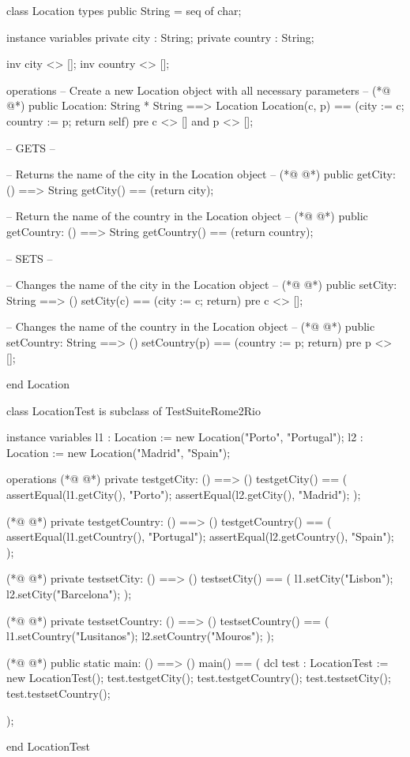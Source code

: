 \begin{vdmpp}[breaklines=true]
class Location
 types
   public String = seq of char;

 instance variables
   private city : String;
   private country : String;
   
   inv city <> [];
   inv country <> [];

 operations
   -- Create a new Location object with all necessary parameters --
(*@
\label{Location:14}
@*)
   public Location: String * String ==> Location
    Location(c, p) == (city := c; country := p; return self)
   pre c <> [] and p <> []; 
  
   -- GETS --
  
   -- Returns the name of the city in the Location object --
(*@
\label{getCity:21}
@*)
   public getCity: () ==> String
    getCity() == (return city);
    
   -- Return the name of the country in the Location object --
(*@
\label{getCountry:25}
@*)
   public getCountry: () ==> String
    getCountry() == (return country);

   -- SETS --
   
   -- Changes the name of the city in the Location object --
(*@
\label{setCity:31}
@*)
   public setCity: String ==> ()
    setCity(c) == (city := c; return)
    pre c <> [];
   
   -- Changes the name of the country in the Location object --
(*@
\label{setCountry:36}
@*)
   public setCountry: String ==> ()
    setCountry(p) == (country := p; return)
    pre p <> [];
   
end Location

class LocationTest is subclass of TestSuiteRome2Rio

 instance variables
 l1 :  Location := new Location("Porto", "Portugal");
 l2 : Location := new Location("Madrid", "Spain");
 
 operations
(*@
\label{testgetCity:49}
@*)
  private testgetCity: () ==> ()
   testgetCity() == (
    assertEqual(l1.getCity(), "Porto");
    assertEqual(l2.getCity(), "Madrid");
   );
   
(*@
\label{testgetCountry:55}
@*)
   private testgetCountry: () ==> ()
   testgetCountry() == (
    assertEqual(l1.getCountry(), "Portugal");
    assertEqual(l2.getCountry(), "Spain");
   );
   
(*@
\label{testsetCity:61}
@*)
   private testsetCity: () ==> ()
   testsetCity() == (
    l1.setCity("Lisbon");
    l2.setCity("Barcelona");
   );
   
(*@
\label{testsetCountry:67}
@*)
   private testsetCountry: () ==> ()
   testsetCountry() == (
    l1.setCountry("Lusitanos");
    l2.setCountry("Mouros");
   );
   
   
(*@
\label{main:74}
@*)
 public static main: () ==> ()
      main() ==
      (
       dcl test : LocationTest := new LocationTest();
       test.testgetCity();
       test.testgetCountry();
       test.testsetCity();
       test.testsetCountry();
       
       );
       
end LocationTest

\end{vdmpp}
